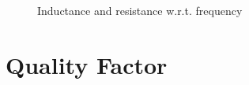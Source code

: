 \begin{figure}[H]
\centering
\begin{subfigmatrix}{2} 
\end{subfigmatrix}
\caption{Inductance and resistance w.r.t. frequency}
\label{F:LRvsF}
\end{figure}


\section{Quality Factor}

